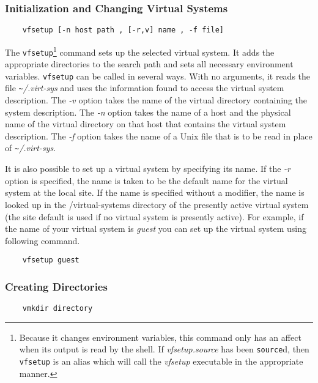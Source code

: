 \subsubsection{Initialization and Changing Virtual Systems}

\begin{verbatim}
    vfsetup [-n host path , [-r,v] name , -f file]
\end{verbatim}

The {\tt vfsetup}\footnote{Because it changes environment variables,
this command only has an affect when its output is read by the shell.
If {\it vfsetup.source} has been {\tt source}d, then {\tt vfsetup} is
an alias which will call the {\it vfsetup} executable in the
appropriate manner.} command sets up the selected virtual system.  It
adds the appropriate directories to the search path and sets all
necessary environment variables. {\tt vfsetup} can be called in
several ways.  With no arguments, it reads the file {\it
\verb+~+/.virt-sys} and uses the information found to access the
virtual system description.  The {\em -v} option takes the name of the
virtual directory containing the system description.  The {\em -n}
option takes the name of a host and the physical name of the virtual
directory on that host that contains the virtual system description.
The {\em -f} option takes the name of a Unix file that is to be read
in place of {\it \verb+~+/.virt-sys}.

It is also possible to set up a virtual system by specifying its name.
If the {\em -r} option is specified, the name is taken to be the
default name for the virtual system at the local site.  If the name is
specified without a modifier, the name is looked up in the {\sc
/virtual-systems} directory of the presently active virtual system
(the site default is used if no virtual system is presently active).
For example, if the name of your virtual system is {\it guest} you can
set up the virtual system using following command.

\begin{verbatim}
    vfsetup guest
\end{verbatim}


\subsubsection{Creating Directories}

\begin{verbatim}
    vmkdir directory
\end{verbatim}

